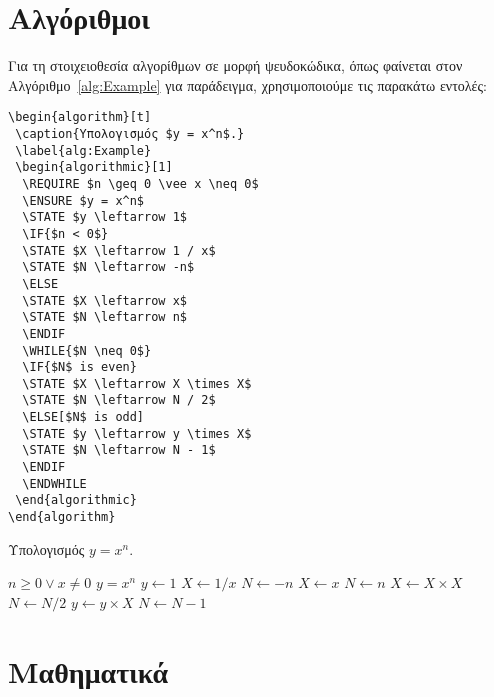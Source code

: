 \section{Αλγόριθμοι}
\label{sec:Algorithms}
Για τη στοιχειοθεσία αλγορίθμων σε μορφή ψευδοκώδικα, όπως φαίνεται στον 
Αλγόριθμο~\ref{alg:Example} για παράδειγμα, χρησιμοποιούμε τις παρακάτω εντολές:

\begin{verbatim}
\begin{algorithm}[t]
 \caption{Υπολογισμός $y = x^n$.}
 \label{alg:Example}
 \begin{algorithmic}[1]
  \REQUIRE $n \geq 0 \vee x \neq 0$
  \ENSURE $y = x^n$
  \STATE $y \leftarrow 1$
  \IF{$n < 0$}
  \STATE $X \leftarrow 1 / x$
  \STATE $N \leftarrow -n$
  \ELSE
  \STATE $X \leftarrow x$
  \STATE $N \leftarrow n$
  \ENDIF
  \WHILE{$N \neq 0$}
  \IF{$N$ is even}
  \STATE $X \leftarrow X \times X$
  \STATE $N \leftarrow N / 2$
  \ELSE[$N$ is odd]
  \STATE $y \leftarrow y \times X$
  \STATE $N \leftarrow N - 1$
  \ENDIF
  \ENDWHILE
 \end{algorithmic}
\end{algorithm}
\end{verbatim}

\begin{algorithm}[t]
	\caption{Υπολογισμός $y = x^n$.}
	\label{alg:Example}
	\begin{algorithmic}[1]
		\REQUIRE $n \geq 0 \vee x \neq 0$
		\ENSURE $y = x^n$
		\STATE $y \leftarrow 1$
		\STATE $X \leftarrow 1 / x$
		\STATE $N \leftarrow -n$
		\ELSE
		\STATE $X \leftarrow x$
		\STATE $N \leftarrow n$
		\ENDIF
		\STATE $X \leftarrow X \times X$
		\STATE $N \leftarrow N / 2$
		\ELSE[$N$ is odd]
		\STATE $y \leftarrow y \times X$
		\STATE $N \leftarrow N - 1$
		\ENDIF
		\ENDWHILE
	\end{algorithmic}
\end{algorithm}


\section{Μαθηματικά}
\label{sec:Mathematics}

